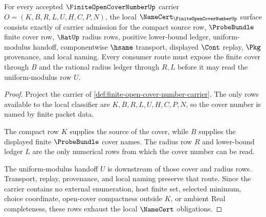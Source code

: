 \begin{theorem}
\label{thm:finite-open-cover-number-namecert-obligations}
For every accepted $\FiniteOpenCoverNumberUp$ carrier $O=(K,B,R,L,U,H,C,P,N)$, the local $\NameCert_{\FiniteOpenCoverNumberUp}$ surface consists exactly of carrier admission for the compact source row, $\ProbeBundle$ finite cover row, $\RatUp$ radius rows, positive lower-bound ledger, uniform-modulus handoff, componentwise $\hsame$ transport, displayed $\Cont$ replay, $\Pkg$ provenance, and local naming. Every consumer route must expose the finite cover through $B$ and the rational radius ledger through $R,L$ before it may read the uniform-modulus row $U$.
\end{theorem}
\begin{proof}
Project the carrier of \autoref{def:finite-open-cover-number-carrier}. The only rows available to the local classifier are $K,B,R,L,U,H,C,P,N$, so the cover number is named by finite packet data.

The compact row $K$ supplies the source of the cover, while $B$ supplies the displayed finite $\ProbeBundle$ cover names. The radius row $R$ and lower-bound ledger $L$ are the only numerical rows from which the cover number can be read.

The uniform-modulus handoff $U$ is downstream of those cover and radius rows. Transport, replay, provenance, and local naming preserve that route. Since the carrier contains no external enumeration, host finite set, selected minimum, choice coordinate, open-cover compactness outside $K$, or ambient Real completeness, these rows exhaust the local $\NameCert$ obligations.
\end{proof}

